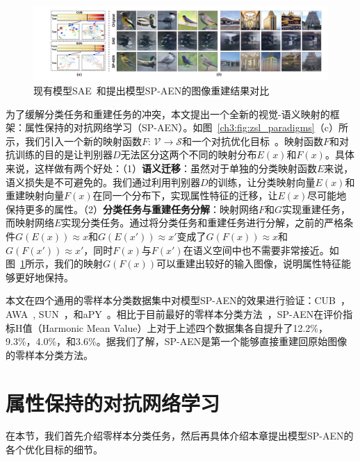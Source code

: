 \begin{figure}[h]
    \centering
        \includegraphics[width=\linewidth]{chapter3/res/reconstruction_visualization.pdf}
    \caption{现有模型SAE~\cite{kodirov2017semantic}和提出模型SP-AEN的图像重建结果对比}
    \label{ch3:fig:reconstruction_visualization}
\end{figure}

为了缓解分类任务和重建任务的冲突，本文提出一个全新的视觉-语义映射的框架：属性保持的对抗网络学习（SP-AEN）。如图~\ref{ch3:fig:zsl_paradigms}（c）所示，我们引入一个新的映射函数$F$: $\mathcal{V}\rightarrow \mathcal{S}$和一个对抗优化目标~\cite{goodfellow2014generative}。映射函数$F$和对抗训练的目的是让判别器$D$无法区分这两个不同的映射分布$E(x)$和$F(x)$。具体来说，这样做有两个好处：（1）\textbf{语义迁移}：虽然对于单独的分类映射函数$E$来说，语义损失是不可避免的。我们通过利用判别器$D$的训练，让分类映射向量$E(x)$和重建映射向量$F(x)$在同一个分布下，实现属性特征的迁移，让$E(x)$尽可能地保持更多的属性。（2）\textbf{分类任务与重建任务分解}：映射网络$F$和$G$实现重建任务，而映射网络$E$实现分类任务。通过将分类任务和重建任务进行分解，之前的严格条件$G(E(x)) \approx x$和$G(E(x')) \approx x'$变成了$G(F(x))\approx x$和$G(F(x'))\approx x'$，同时$F(x)$与$F(x')$在语义空间中也不需要非常接近。如图~\ref{ch3:fig:reconstruction_visualization}所示，我们的映射$G(F(x))$可以重建出较好的输入图像，说明属性特征能够更好地保持。

本文在四个通用的零样本分类数据集中对模型SP-AEN的效果进行验证：CUB~\cite{wah2011caltech}，AWA~\cite{lampert2009learning}, SUN~\cite{patterson2012sun}，和aPY~\cite{farhadi2009describing}。相比于目前最好的零样本分类方法~\cite{xian2017zero}，SP-AEN在评价指标H值（Harmonic Mean Value）上对于上述四个数据集各自提升了12.2\%，9.3\%，4.0\%，和3.6\%。据我们了解，SP-AEN是第一个能够直接重建回原始图像的零样本分类方法。


\section{属性保持的对抗网络学习}

在本节，我们首先介绍零样本分类任务，然后再具体介绍本章提出模型SP-AEN的各个优化目标的细节。

